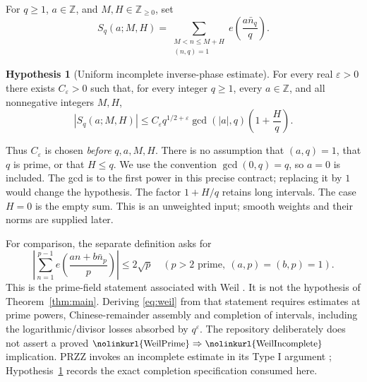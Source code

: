 \documentclass[11pt]{article}
\theoremstyle{definition}
\newtheorem{hypothesis}{Hypothesis}
\DeclareRobustCommand{\lean}[1]{\ifmmode\text{\small\nolinkurl{#1}}\else{\small\nolinkurl{#1}}\fi}
\begin{document}
For $q\ge1$, $a\in\mathbb Z$, and $M,H\in\mathbb Z_{\ge0}$, set
\[
 S_q(a;M,H)=
 \sum_{\substack{M<n\le M+H\\(n,q)=1}}
     e\!\left(\frac{a\bar n_q}{q}\right).
\]
\begin{hypothesis}[Uniform incomplete inverse-phase estimate]\label{hyp:weil}
For every real $\varepsilon>0$ there exists $C_\varepsilon>0$ such that,
for every integer $q\ge1$, every $a\in\mathbb Z$, and all nonnegative
integers $M,H$,
\begin{equation}\label{eq:weil}
 |S_q(a;M,H)|
 \le C_\varepsilon q^{1/2+\varepsilon}
          \gcd(|a|,q)\left(1+\frac Hq\right).
\end{equation}
\end{hypothesis}

Thus $C_\varepsilon$ is chosen \emph{before} $q,a,M,H$. There is no
assumption that $(a,q)=1$, that $q$ is prime, or that $H\le q$.
We use the convention $\gcd(0,q)=q$, so $a=0$ is included.
The gcd is to the first power in this precise contract; replacing it
by $1$ would change the hypothesis. The factor $1+H/q$ retains long
intervals. The case $H=0$ is the empty sum. This is an unweighted input;
smooth weights and their norms are supplied later.

For comparison, the separate definition \lean{WeilPrime} asks for
\[
 \left|\sum_{n=1}^{p-1}e\!\left(\frac{an+b\bar n_p}{p}\right)\right|
 \le 2\sqrt p
 \quad(p>2\text{ prime},\ (a,p)=(b,p)=1).
\]
This is the prime-field statement associated with Weil
\cite{Weil,Harcos}. It is not the hypothesis of Theorem~\ref{thm:main}.
Deriving \eqref{eq:weil} from that statement requires estimates at prime
powers, Chinese-remainder assembly and completion of intervals, including
the logarithmic/divisor losses absorbed by $q^\varepsilon$. The
repository deliberately does not assert a proved
$\lean{WeilPrime}\Rightarrow\lean{WeilIncomplete}$ implication.
PRZZ invokes an incomplete estimate in its Type I argument
\cite[p.~21]{PRZZ}; Hypothesis~\ref{hyp:weil} records the exact
completion specification consumed here.
\end{document}
